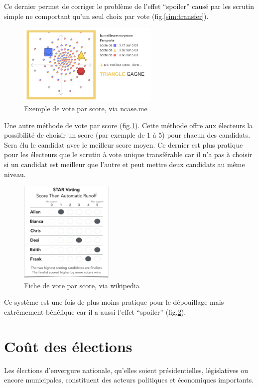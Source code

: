 \documentclass[11pt,a4paper]{report}
\begin{document}
Ce dernier permet de corriger le problème de l’effet “spoiler” causé par les scrutin simple ne comportant qu’un seul choix par vote (fig.\ref{sim:transfer}).

\begin{figure}[h]
	\centering
	\includegraphics[width=0.6\textwidth]{./images/scores.png}
	\caption{Exemple de vote par score, via ncase.me \cite{ncase:ballot}}
	\label{sim:stars}
\end{figure}

Une autre méthode de vote par score (fig.\ref{sim:stars}).
Cette méthode offre aux électeurs la possibilité de choisir un score (par exemple de 1 à 5) pour chacun des candidats.
Sera élu le candidat avec le meilleur score moyen.
Ce dernier est plus pratique pour les électeurs que  le scrutin à vote unique transférable car il n’a pas à choisir si un candidat est meilleur que l’autre et peut mettre deux candidats au même niveau.

\begin{figure}[h]
	\centering
	\includegraphics[width=0.4\textwidth]{./images/star.png}
	\caption{Fiche de vote par score, via wikipedia \cite{wiki:scorevoting}}
	\label{sim:scores}
\end{figure}

Ce système est une fois de plus moins pratique pour le dépouillage mais extrêmement bénéfique car il a aussi l’effet “spoiler” (fig.\ref{sim:scores}).

\section{Coût des élections}
Les élections d'envergure nationale, qu'elles soient présidentielles, législatives ou encore municipales, constituent des acteurs politiques et économiques importants.
\end{document}
